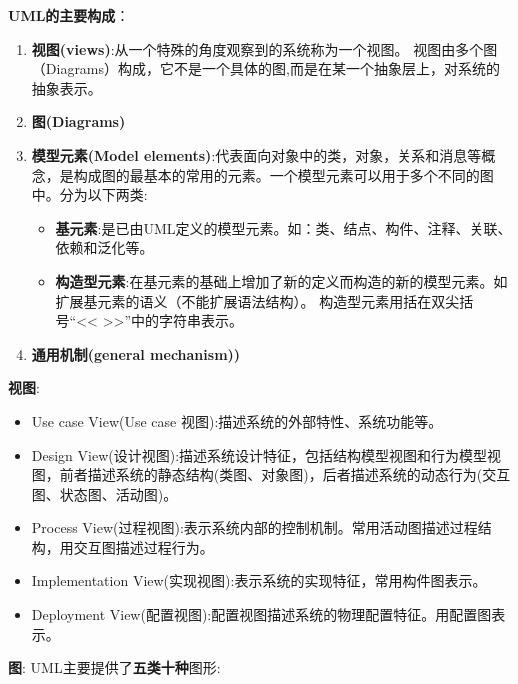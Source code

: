 \documentclass[../main.tex]{subfiles}
\begin{document}
\textbf{UML的主要构成}：
\begin{enumerate}
  \item \textbf{视图(views)}:从一个特殊的角度观察到的系统称为一个视图。
    视图由多个图（Diagrams）构成，它不是一个具体的图,而是在某一个抽象层上，对系统的抽象表示。
  \item \textbf{图(Diagrams)}
  \item \textbf{模型元素(Model elements)}:代表面向对象中的类，对象，关系和消息等概念，是构成图的最基本的常用的元素。一个模型元素可以用于多个不同的图中。分为以下两类:
    \begin{itemize}
      \item \textbf{基元素}:是已由UML定义的模型元素。如：类、结点、构件、注释、关联、依赖和泛化等。
      \item \textbf{构造型元素}:在基元素的基础上增加了新的定义而构造的新的模型元素。如扩展基元素的语义（不能扩展语法结构）。
        构造型元素用括在双尖括号``<< >>''中的字符串表示。
    \end{itemize}
  \item \textbf{通用机制(general mechanism))}
\end{enumerate}
\textbf{视图}:
\begin{itemize}
  \item Use case View(Use case 视图):描述系统的外部特性、系统功能等。
  \item Design View(设计视图):描述系统设计特征，包括结构模型视图和行为模型视图，前者描述系统的静态结构(类图、对象图)，后者描述系统的动态行为(交互图、状态图、活动图)。
  \item Process View(过程视图):表示系统内部的控制机制。常用活动图描述过程结构，用交互图描述过程行为。
  \item Implementation View(实现视图):表示系统的实现特征，常用构件图表示。
  \item Deployment View(配置视图):配置视图描述系统的物理配置特征。用配置图表示。
\end{itemize}
\textbf{图}:
UML主要提供了\textbf{五类十种}图形:
\end{document}
